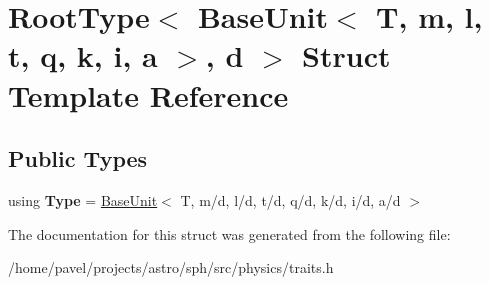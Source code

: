 \hypertarget{structRootType_3_01BaseUnit_3_01T_00_01m_00_01l_00_01t_00_01q_00_01k_00_01i_00_01a_01_4_00_01d_01_4}{}\section{Root\+Type$<$ Base\+Unit$<$ T, m, l, t, q, k, i, a $>$, d $>$ Struct Template Reference}
\label{structRootType_3_01BaseUnit_3_01T_00_01m_00_01l_00_01t_00_01q_00_01k_00_01i_00_01a_01_4_00_01d_01_4}
\subsection*{Public Types}
\begin{DoxyCompactItemize}
\item 
\hypertarget{structRootType_3_01BaseUnit_3_01T_00_01m_00_01l_00_01t_00_01q_00_01k_00_01i_00_01a_01_4_00_01d_01_4_a35b99617dc32cdfefc978d98bf6b3617}{}\label{structRootType_3_01BaseUnit_3_01T_00_01m_00_01l_00_01t_00_01q_00_01k_00_01i_00_01a_01_4_00_01d_01_4_a35b99617dc32cdfefc978d98bf6b3617} 
using {\bfseries Type} = \hyperlink{classBaseUnit}{Base\+Unit}$<$ T, m/d, l/d, t/d, q/d, k/d, i/d, a/d $>$
\end{DoxyCompactItemize}


The documentation for this struct was generated from the following file\+:\begin{DoxyCompactItemize}
\item 
/home/pavel/projects/astro/sph/src/physics/traits.\+h\end{DoxyCompactItemize}
